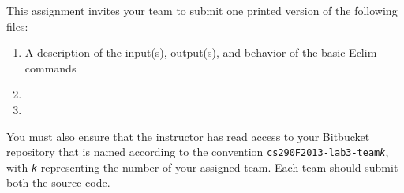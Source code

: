This assignment invites your team to submit one printed version of the following files:

\begin{enumerate}
	
	\item A description of the input(s), output(s), and behavior of the basic Eclim commands 
	\item 
	\item 

\end{enumerate}

You must also ensure that the instructor has read access to your Bitbucket repository that is named according to the
convention {\tt cs290F2013-lab3-team{\em k}}, with {\tt {\em k}} representing the number of your assigned team. 
Each team should submit both the source code.


